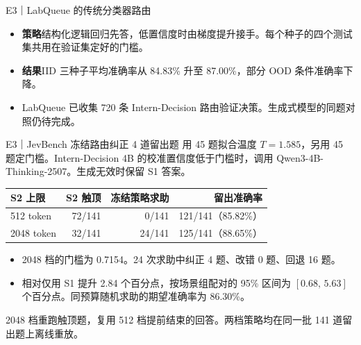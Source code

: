 \documentclass{beamer}
\begin{document}
\begin{frame}{E3｜LabQueue 的传统分类器路由}
  \small
  \begin{itemize}
    \item \textbf{策略}\quad 结构化逻辑回归先答，低置信度时由梯度提升接手。每个种子的四个测试集共用在验证集定好的门槛。
    \item \textbf{结果}\quad IID 三种子平均准确率从 84.83\% 升至 87.00\%，部分 OOD 条件准确率下降。
    \item LabQueue 已收集 720 条 Intern-Decision 路由验证决策。生成式模型的同题对照仍待完成。
  \end{itemize}
\end{frame}

\begin{frame}{E3｜JevBench 冻结路由纠正 4 道留出题}
  \small
  用 45 题拟合温度 $T=1.585$，另用 45 题定门槛。Intern-Decision 4B 的校准置信度低于门槛时，调用 Qwen3-4B-Thinking-2507。生成无效时保留 S1 答案。

  \medskip
  {\centering
  \setlength{\tabcolsep}{6pt}
  \begin{tabular}{@{}lrrr@{}}
    \toprule
    \textbf{S2 上限} & \textbf{S2 触顶} & \textbf{冻结策略求助} & \textbf{留出准确率}\\
    \midrule
    512 token  & 72/141 & 0/141  & 121/141（85.82\%）\\
    2048 token & 32/141 & 24/141 & 125/141（88.65\%）\\
    \bottomrule
  \end{tabular}\par}

  \medskip
  \begin{itemize}
    \item 2048 档的门槛为 0.7154。24 次求助中纠正 4 题、改错 0 题、回退 16 题。
    \item 相对仅用 S1 提升 2.84 个百分点，按场景组配对的 95\% 区间为 $[0.68,\,5.63]$ 个百分点。同预算随机求助的期望准确率为 86.30\%。
  \end{itemize}
  {\footnotesize 2048 档重跑触顶题，复用 512 档提前结束的回答。两档策略均在同一批 141 道留出题上离线重放。\par}
\end{frame}
\end{document}
